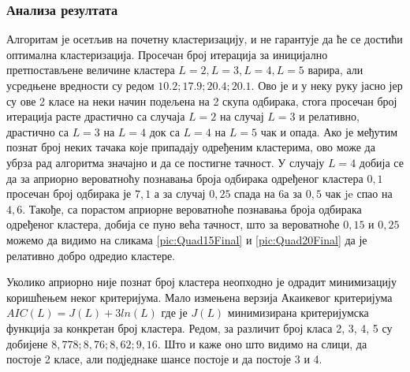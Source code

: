 \subsubsection{Анализа резултата}
Алгоритам је осетљив на почетну кластеризацију, и не гарантује да ће се достићи оптимална кластеризација. Просечан број итерација за иницијално претпостављене величине кластера $L=2, L=3, L=4,L=5$ варира, али усредњене вредности су редом $10.2 ; 17.9; 20.4; 20.1$. Ово је и у неку руку јасно јер су ове 2 класе на неки начин подељена на 2 скупа одбирака, стога просечан број итерација расте драстично са случаја $L=2$ на случај $L=3$ и релативно,  драстично са $L=3$ на $L=4$ док са $L=4$ на $L=5$ чак и опада.  Ако је међутим познат број неких тачака које припадају одређеним кластерима, ово може да убрза рад алгоритма значајно и да се постигне тачност. У случају $L=4$ добија се да за априорно вероватноћу познавања броја одбирака одређеног кластера $0,1$ просечан број одбирака је $7,1$ а за случај $0,25$ спада на $6$а за $0,5$ чак je спао на $4,6$. Такође, са порастом априорне вероватноће познавања броја одбирака одређеног кластера, добија се пуно већа тачност, што за вероватноће $0,15$ и $0,25$ можемо да видимо на сликама \ref{pic:Quad15Final} и \ref{pic:Quad20Final} да је релативно добро одредио кластере.

Уколико априорно није познат број кластера неопходно је одрадит минимизацију коришћењем неког критеријума. Мало измењена верзија Акаикевог критеријума $AIC(L) =J(L) +3 ln(L)$ где је $J(L)$ минимизирана критеријумска функција за конкретан број кластера. Редом, за различит број класа 2, 3, 4, 5 су добијене $8,778;8,76;8,62;9,16$.  Што и каже оно што видимо на слици, да постоје 2 класе, али подједнаке шансе постоје и да постоје 3 и 4.

